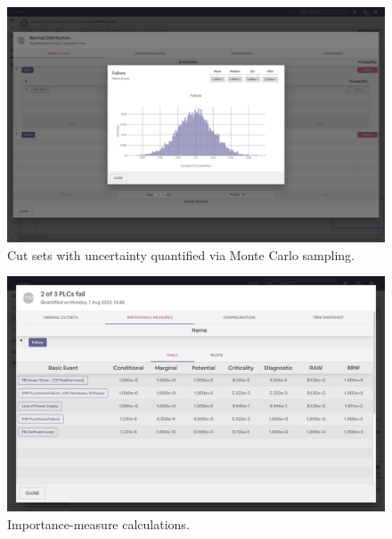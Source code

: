 \begin{figure}
  \centering
  \includegraphics[width=\textwidth]{4_proposed_solution/web_app/figures/cutsets_uncertainty.png}
  \caption{Cut sets with uncertainty quantified via Monte Carlo sampling.}
  \label{fig:cutsets_uncertainty}
\end{figure}

\begin{figure}
  \centering
  \includegraphics[width=\textwidth]{4_proposed_solution/web_app/figures/importance.png}
  \caption{Importance-measure calculations.}
  \label{fig:importance_measures}
\end{figure}

